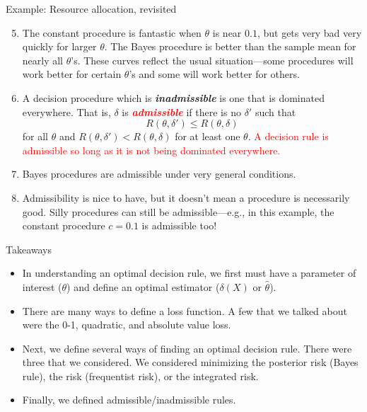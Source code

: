 \documentclass[
  ignorenonframetext,
]{beamer}
\providecommand{\tightlist}{%
  \setlength{\itemsep}{0pt}\setlength{\parskip}{0pt}}
\newcommand{\term}[1]{\textit{\textbf{#1}}}
\begin{document}
\begin{frame}{Example: Resource allocation, revisited}
\protect\hypertarget{example-resource-allocation-revisited-3}{}

\begin{enumerate}
\setcounter{enumi}{4}
\tightlist
\item
  The constant procedure is fantastic when \(\theta\) is near \(0.1\),
  but gets very bad very quickly for larger \(\theta\). The Bayes
  procedure is better than the sample mean for nearly all \(\theta\)'s.
  These curves reflect the usual situation---some procedures will work
  better for certain \(\theta\)'s and some will work better for others.
\item
  A decision procedure which is \term{inadmissible} is one that is
  dominated everywhere. That is, \(\delta\) is
  \term{\textcolor{red}{admissible}} if there is no \(\delta'\) such
  that \[R(\theta,\delta')\leq R(\theta,\delta)\] for all \(\theta\) and
  \(R(\theta,\delta')< R(\theta,\delta)\) for at least one \(\theta\).
  \textcolor{red}{A decision rule is admissible so long as it is not being dominated everywhere.}\\
\item
  Bayes procedures are admissible under very general conditions.
\item
  Admissibility is nice to have, but it doesn't mean a procedure is
  necessarily good. Silly procedures can still be admissible---e.g., in
  this example, the constant procedure \(c = 0.1\) is admissible too!
\end{enumerate}

\end{frame}

\begin{frame}{Takeaways}
\protect\hypertarget{takeaways}{}

\begin{itemize}
\item
  In understanding an optimal decision rule, we first must have a
  parameter of interest (\(\theta\)) and define an optimal estimator
  (\(\delta(X)\) or \(\hat{\theta}\)).
\item
  There are many ways to define a loss function. A few that we talked
  about were the 0-1, quadratic, and absolute value loss.
\item
  Next, we define several ways of finding an optimal decision rule.
  There were three that we considered. We considered minimizing the
  posterior risk (Bayes rule), the risk (frequentist risk), or the
  integrated risk.
\item
  Finally, we defined admissible/inadmissible rules.
\end{itemize}

\end{frame}
\end{document}
